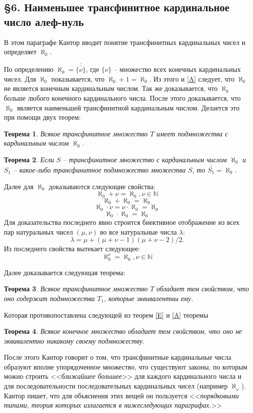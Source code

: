 \documentclass[a4paper,12pt]{extarticle}
\newtheorem{theorem}{Теорема}[subsection]
\theoremstyle{definition}
\newcommand{\cit}[1]{<<\textit{#1}>>}
\newcommand{\car}[1]{\overline{\overline{#1}}}
\begin{document}
\subsection{\S 6. Наименьшее трансфинитное кардинальное число алеф-нуль}
В этом параграфе Кантор вводит понятие трансфинитных кардинальных чисел и определяет $\aleph_0$.

По определению $\aleph_0 = \car{\{\nu\}}$, где $\{\nu\}$ -- множество всех конечных кардинальных чисел.
Для $\aleph_0$ показывается, что $\aleph_0 + 1 = \aleph_0$.
Из этого и \ref{A} следует, что $\aleph_0$ не является конечным кардинальным числом.
Так же доказывается, что $\aleph_0$ больше любого конечного кардинального числа.
После этого доказывается, что $\aleph_0$ является наименьшей трансфинитной кардинальным числом.
Делается это при помощи двух теорем:
\begin{theorem}
    Всякое трансфинитное множество $T$ имеет подмножества с кардинальным числом $\aleph_0$.
\end{theorem}
\begin{theorem}
    Если $S$ -- трансфинитное множество с кардинальным числом $\aleph_0$ и $S_1$ -- какое-либо трансфинитное подмножество множества $S$, то $\car{S_1} = \aleph_0$.
\end{theorem}

Далее для $\aleph_0$ доказываются следующие свойства:
$$ \aleph_0 + \nu = \aleph_0, \nu \in \mathbb{N} $$
$$ \aleph_0 + \aleph_0 = \aleph_0 $$
$$ \aleph_0 \cdot \nu = \nu \cdot \aleph_0 = \aleph_0 $$
$$ \aleph_0 \cdot \aleph_0 = \aleph_0 $$
Для доказательства последнего явно строится биективное отображение из всех пар натуральных чисел $(\mu, \nu)$ во все натуральные числа $\lambda$:
$$ \lambda = \mu + (\mu + \nu - 1)(\mu + \nu - 2)/2. $$
Из последнего свойства вытекает следующее:
$$ \aleph_0^{\nu} = \aleph_0, \nu \in \mathbb{N} $$

Далее доказывается следующая теорема:
\begin{theorem}
    Всякое трансфинитное множество $T$ обладает тем свойством, что оно содержит подмножества $T_1$, которые эквивалентны ему.
\end{theorem}
Которая противопоставлена следующей из теорем \ref{E} и \ref{A} теоремы
\begin{theorem}
    Всякое конечное множество обладает тем свойством, что оно не эквивалентно никакому своему подмножеству.
\end{theorem}

После этого Кантор говорит о том, что трансфинитные кардинальные числа образуют вполне упорядоченное множество,
что существуют законы, по которым можно строить \cit{ближайшее большее} для каждого кардинального числа и
для последовательности последовательных кардинальных чисел (например $\aleph_{\omega}$).
Кантор пишет, что для объяснения этих вещей он пользуется \cit{порядковыми типами,
теория которых излагается в нижеследующих параграфах.}
\end{document}
